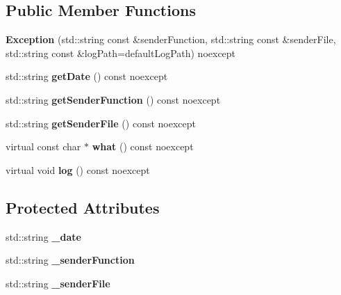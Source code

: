 \subsection*{Public Member Functions}
\begin{DoxyCompactItemize}
\item 
\hypertarget{classstb_1_1Exception_a3f3399cc51b264e13c076a093cf56ec5}{{\bfseries Exception} (std\+::string const \&sender\+Function, std\+::string const \&sender\+File, std\+::string const \&log\+Path=default\+Log\+Path) noexcept}\label{classstb_1_1Exception_a3f3399cc51b264e13c076a093cf56ec5}

\item 
\hypertarget{classstb_1_1Exception_aa0271b97c5d48bfaf852ff09f51a3d01}{std\+::string {\bfseries get\+Date} () const noexcept}\label{classstb_1_1Exception_aa0271b97c5d48bfaf852ff09f51a3d01}

\item 
\hypertarget{classstb_1_1Exception_aab153e8bbf9632db2cdcbe9c89aeae12}{std\+::string {\bfseries get\+Sender\+Function} () const noexcept}\label{classstb_1_1Exception_aab153e8bbf9632db2cdcbe9c89aeae12}

\item 
\hypertarget{classstb_1_1Exception_aafa5b38a0d4125d404e21ee6e4efcc0c}{std\+::string {\bfseries get\+Sender\+File} () const noexcept}\label{classstb_1_1Exception_aafa5b38a0d4125d404e21ee6e4efcc0c}

\item 
\hypertarget{classstb_1_1Exception_acd74a55ff7ee3f8ae7e174c6b5f5330b}{virtual const char $\ast$ {\bfseries what} () const noexcept}\label{classstb_1_1Exception_acd74a55ff7ee3f8ae7e174c6b5f5330b}

\item 
\hypertarget{classstb_1_1Exception_aea822580601e59258a3910abf1bee163}{virtual void {\bfseries log} () const noexcept}\label{classstb_1_1Exception_aea822580601e59258a3910abf1bee163}

\end{DoxyCompactItemize}
\subsection*{Protected Attributes}
\begin{DoxyCompactItemize}
\item 
\hypertarget{classstb_1_1Exception_aae276b88f54971de95dcf6aabcee481f}{std\+::string {\bfseries \+\_\+date}}\label{classstb_1_1Exception_aae276b88f54971de95dcf6aabcee481f}

\item 
\hypertarget{classstb_1_1Exception_ab2d8d8032cc347291ec489f395e58401}{std\+::string {\bfseries \+\_\+sender\+Function}}\label{classstb_1_1Exception_ab2d8d8032cc347291ec489f395e58401}

\item 
\hypertarget{classstb_1_1Exception_a26d6e9f838982d09999787b2427d2535}{std\+::string {\bfseries \+\_\+sender\+File}}\label{classstb_1_1Exception_a26d6e9f838982d09999787b2427d2535}

\end{DoxyCompactItemize}

